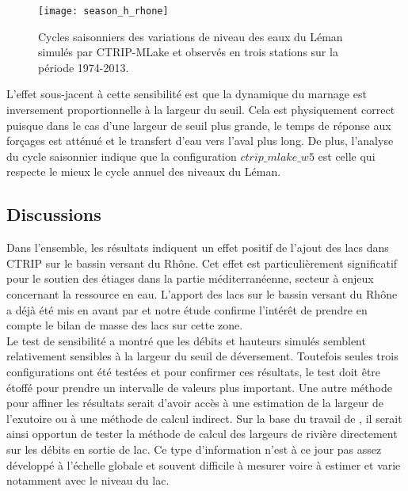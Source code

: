 \begin{figure}[h!]
\centering
\texttt{[image: season\_h\_rhone]}
\caption{Cycles saisonniers des variations de niveau des eaux du Léman simulés par CTRIP-MLake et observés en trois stations sur la période 1974-2013.}
\label{season_h_rhone}
\end{figure}

L'effet sous-jacent à cette sensibilité est que la dynamique du marnage est inversement proportionnelle à la largeur du seuil. Cela est physiquement correct puisque dans le cas d'une largeur de seuil plus grande, le temps de réponse aux forçages est atténué et le transfert d'eau vers l'aval plus long. De plus, l'analyse du cycle saisonnier indique que la configuration $ctrip\_mlake\_w5$ est celle qui respecte le mieux le cycle annuel des niveaux du Léman.


\subsection{{\selectfont Discussions}}

\noindent Dans l'ensemble, les résultats indiquent un effet positif de l'ajout des lacs dans CTRIP sur le bassin versant du Rhône. Cet effet est particulièrement significatif pour le soutien des étiages dans la partie méditerranéenne, secteur à enjeux concernant la ressource en eau. L'apport des lacs sur le bassin versant du Rhône a déjà été mis en avant par \citet{zajac2017} et notre étude confirme l'intérêt de prendre en compte le bilan de masse des lacs sur cette zone. \\
Le test de sensibilité a montré que les débits et hauteurs simulés semblent relativement sensibles à la largeur du seuil de déversement. Toutefois seules trois configurations ont été testées et pour confirmer ces résultats, le test doit être étoffé pour prendre un intervalle de valeurs plus important. Une autre méthode pour affiner les résultats serait d'avoir accès à une estimation de la largeur de l'exutoire ou à une méthode de calcul indirect. Sur la base du travail de \citet{vergnes2012}, il serait ainsi opportun de tester la méthode de calcul des largeurs de rivière directement sur les débits en sortie de lac. Ce type d'information n'est à ce jour pas assez développé à l'échelle globale et souvent difficile à mesurer voire à estimer et varie notamment avec le niveau du lac. \\

